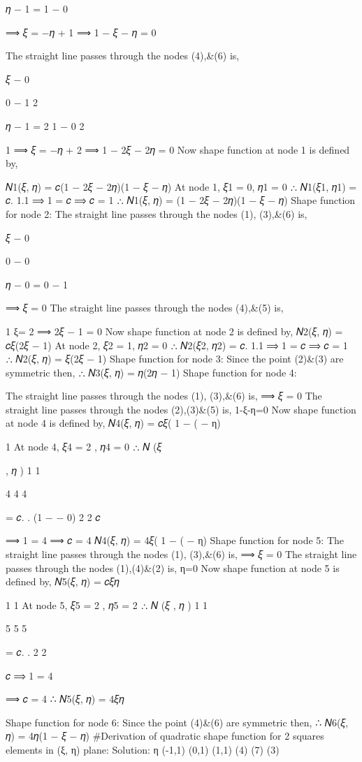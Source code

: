 {{{{{{𝜂 − 1
=
1 − 0
 
⟹ 𝜉 = −𝜂 + 1
⟹ 1 − 𝜉 − 𝜂 = 0


The straight line passes through the nodes (4),&(6) is,

 
𝜉 − 0

 
0 − 1
2
 
𝜂 − 1
=	2
1 − 0
2
 
1
⟹ 𝜉 = −𝜂 +  
2
⟹ 1 − 2𝜉 − 2𝜂 = 0
Now shape function at node 1 is defined by,
 
𝑁1(𝜉, 𝜂) = 𝑐(1 − 2𝜉 − 2𝜂)(1 − 𝜉 − 𝜂)
At node 1, 𝜉1 = 0, 𝜂1 = 0
∴ 𝑁1(𝜉1, 𝜂1) = 𝑐. 1.1
⟹ 1 = 𝑐
⟹ 𝑐 = 1
∴ 𝑁1(𝜉, 𝜂) = (1 − 2𝜉 − 2𝜂)(1 − 𝜉 − 𝜂)
Shape function for node 2:
The straight line passes through the nodes (1), (3),&(6) is,

 
𝜉 − 0

 
0 − 0
 
𝜂 − 0
=
0 − 1
 
⟹ 𝜉 = 0
The straight line passes through the nodes (4),&(5) is,

1
ξ=
2
⟹ 2𝜉 − 1 = 0
Now shape function at node 2 is defined by,
𝑁2(𝜉, 𝜂) = 𝑐𝜉(2𝜉 − 1)
At node 2, 𝜉2 = 1, 𝜂2 = 0
∴ 𝑁2(𝜉2, 𝜂2) = 𝑐. 1.1
⟹ 1 = 𝑐
⟹ 𝑐 = 1
∴ 𝑁2(𝜉, 𝜂) = 𝜉(2𝜉 − 1)
Shape function for node 3:
Since the point (2)&(3) are symmetric then,
∴ 𝑁3(𝜉, 𝜂) = 𝜂(2𝜂 − 1)
Shape function for node 4:
 
The straight line passes through the nodes (1), (3),&(6) is,
⟹ 𝜉 = 0
The straight line passes through the nodes (2),(3)&(5) is,
1-ξ-η=0
Now shape function at node 4 is defined by,
𝑁4(𝜉, 𝜂) = 𝑐𝜉( 1 − ( − η)

 
1
At node 4, 𝜉4 = 2 , 𝜂4 = 0
∴ 𝑁 (𝜉
 


, 𝜂 )	1	1
 
4	4	4
 
= 𝑐.   . (1 −   − 0)
2	2
𝑐
 
⟹ 1 =  
4
⟹ 𝑐 = 4
𝑁4(𝜉, 𝜂) = 4𝜉( 1 − ( − η)
Shape function for node 5:
The straight line passes through the nodes (1), (3),&(6) is,
⟹ 𝜉 = 0
The straight line passes through the nodes (1),(4)&(2) is,
η=0 Now shape function at node 5 is defined by,
𝑁5(𝜉, 𝜂) = 𝑐𝜉𝜂

1	1
At node 5, 𝜉5 = 2 , 𝜂5 = 2
∴ 𝑁 (𝜉 , 𝜂 )	1 1
 
5	5	5
 
= 𝑐.   .  
2 2
 

𝑐
⟹ 1 =  
4
 
⟹ 𝑐 = 4
∴ 𝑁5(𝜉, 𝜂) = 4𝜉𝜂
 
Shape function for node 6:
Since the point (4)&(6) are symmetric then,
∴ 𝑁6(𝜉, 𝜂) = 4𝜂(1 − 𝜉 − 𝜂)
#Derivation of quadratic shape function for 2 squares elements in (ξ, η) plane:
Solution:
η
(-1,1)	(0,1)	(1,1)
(4)	(7)	(3)


}}}}}}
